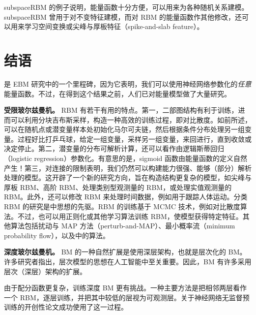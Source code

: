 subspaceRBM 的例子说明，能量函数十分方便，可以用来为各种随机关系建模。subspaceRBM 曾用于对不变特征建模，而对 RBM 的能量函数作其他修改，还可以用来学习空间变换或尖峰与厚板特征（spike-and-slab feature）。

\section{结语}
是 EBM 研究中的一个里程碑，因为它表明，我们可以使用神经网络参数化的\emph{任意}能量函数。不过，在得到这个结果之前，人们已对能量模型做了大量研究。

\noindent\textbf{受限玻尔兹曼机。} RBM 有若干有用的特点。第一，二部图结构有利于训练，进而可以利用分块吉布斯采样，构造一种高效的训练过程，即对比散度。如前所述，可以在随机点或潜变量样本处初始化马尔可夫链，然后根据条件分布处理另一组变量。过程好比打乒乓球，给定一组变量，采样另一组变量，来回进行，直到收敛或决定停止。第二，潜变量的分布可解析计算，还可以看作由逻辑斯蒂回归（logistic regression）参数化。有意思的是，sigmoid 函数由能量函数的定义自然产生！第三，对连接的限制表明，我们仍然可以构建能力很强、能够（部分）解析处理的模型。这开辟了一个新的研究方向，旨在构造结构更复杂的模型，如尖峰与厚板 RBM、高阶 RBM、处理类别型观测量的 RBM，或处理实值观测量的 RBM。此外，还可以修改 RBM 来处理时间数据，例如用于跟踪人体运动。分类 RBM 的研究是中思想的先驱。RBM 的训练基于 MCMC 技术，例如对比散度算法。不过，也可以用正则化或其他学习算法训练 RBM，使模型获得特定特征。其他算法包括扰动与 MAP 方法（perturb-and-MAP）、最小概率流（minimum probability flow），以及中的算法。

\noindent\textbf{深度玻尔兹曼机。} BM 的一种自然扩展是使用深层架构，也就是层次化的 BM。许多研究者指出，层次模型的思想在人工智能中至关重要。因此，BM 有许多采用层次（深层）架构的扩展。

由于配分函数更复杂，训练深度 BM 更有挑战。一种主要方法是把相邻两层看作一个 RBM，逐层训练，并把其中较低的层视为可观测层。关于神经网络无监督预训练的开创性论文成功使用了这一过程。

